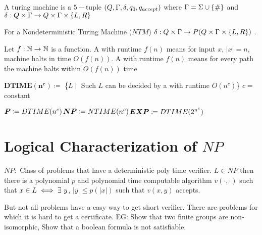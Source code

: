 \documentclass{article}
\begin{document}
	
	A turing machine  is a $5-$tuple $(Q,\Gamma, \delta, q_0, q_{accept})$ where $\Gamma=\Sigma\cup \{\#\}$ and $\delta:Q\times \Gamma\to Q\times \Gamma\times \{L,R\}$
	
	For a Nondeterministic Turing Machine ($NTM$)  $\delta :Q\times \Gamma\to P(Q\times \Gamma\times \{L,R\})$
	. 
	\begin{center}
	\end{center}
	
	Let $f:\mathbb{N}\to \mathbb{N}$ is a function. A \dtm with runtime $f(n)$ means for input $x$, $|x|=n$, machine halts in time $O(f(n))$. A \ntm  with runtime $f(n)$ means for every path the machine halts within $O(f(n))$ time
\parinf

$\boldsymbol{DTIME(n^c)}\coloneqq$ \{$L\mid$ Such $L$ can be decided by a \dtm with runtime $O(n^c)$\} $c=$constant

$\boldsymbol{P}\coloneqq DTIME(n^c)$\hfill $\boldsymbol{N}\boldsymbol{P}\coloneqq NTIME(n^c)$\hfill $\boldsymbol{E}\boldsymbol{X}\boldsymbol{P}\coloneqq DTIME(2^{n^c})$

\section{Logical Characterization of $NP$}
$NP:$ Class of problems that have a deterministic poly time verifier. $L\in NP$ then there is a polynomial $p$ and polynomial time computable algorithm $v(\cdot,\cdot)$ such that $x\in L\iff \exists \ y$, $|y|\leq p(|x|)$ such that $v(x,y)$ accepts.\parinn

But not all problems have a easy way to get short verifier. There are problems for which it is hard to get a certificate. EG: Show that two finite groups are non-isomorphic, Show that a boolean formula is not satisfiable.
\end{document}
